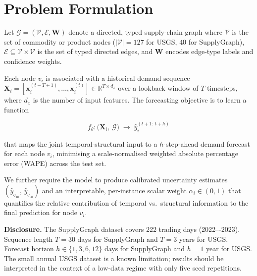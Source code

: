 
\section{Problem Formulation}
\label{sec:problem}

Let $\mathcal{G} = (\mathcal{V}, \mathcal{E}, \mathbf{W})$ denote
a directed, typed supply-chain graph where $\mathcal{V}$ is the
set of commodity or product nodes ($|\mathcal{V}|{=}127$ for USGS,
$40$ for SupplyGraph), $\mathcal{E} \subseteq \mathcal{V} \times
\mathcal{V}$ is the set of typed directed edges, and $\mathbf{W}$
encodes edge-type labels and confidence weights.

Each node $v_i$ is associated with a historical demand sequence
$\mathbf{X}_i = [\mathbf{x}^{(t-T+1)}_i, \ldots,
\mathbf{x}^{(t)}_i] \in \mathbb{R}^{T \times d_x}$ over a lookback
window of $T$ timesteps, where $d_x$ is the number of input
features. The forecasting objective is to learn a function

\begin{equation}
  f_\theta: \bigl(\mathbf{X}_i,\,\mathcal{G}\bigr)
  \;\longrightarrow\;
  \hat{y}_i^{(t+1:\,t+h)}
  \label{eq:objective}
\end{equation}

\noindent that maps the joint temporal-structural input to a
$h$-step-ahead demand forecast for each node $v_i$, minimising
a scale-normalised weighted absolute percentage error (WAPE)
across the test set.

We further require the model to produce calibrated uncertainty
estimates $(\hat{y}_{q_{10}},\, \hat{y}_{q_{90}})$ and an
interpretable, per-instance scalar weight $\alpha_i \in (0,1)$
that quantifies the relative contribution of temporal vs.\
structural information to the final prediction for node $v_i$.

\smallskip
\noindent\textbf{Disclosure.} The SupplyGraph dataset covers
222 trading days (2022–-2023). Sequence length $T{=}30$ days for
SupplyGraph and $T{=}3$ years for USGS. Forecast horizon
$h \in \{1, 3, 6, 12\}$ days for SupplyGraph and $h{=}1$ year
for USGS. The small annual USGS dataset is a known limitation;
results should be interpreted in the context of a low-data regime
with only five seed repetitions.
